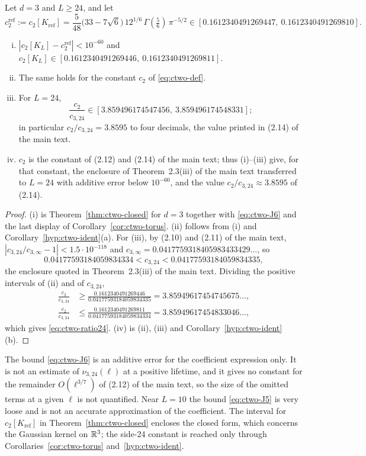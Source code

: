 \begin{corollary}\label{cor:ctwo-side24}
Let $d=3$ and $L\ge24$, and let
\[
c_2^{\mathrm{ref}}:=c_2[K_{\mathrm{ref}}]=\frac5{48}\bigl(33-7\sqrt6\bigr)\,12^{1/6}\,\Gamma(\tfrac56)\,\pi^{-5/2}\in[0.1612340491269447,\ 0.1612340491269810].
\]
\begin{enumerate}[(i),leftmargin=2em]
\item $|c_2[K_L]-c_2^{\mathrm{ref}}|<10^{-60}$ and $c_2[K_L]\in[0.1612340491269446,\ 0.1612340491269811]$.
\item The same holds for the constant $c_2$ of \eqref{eq:ctwo-def}.
\item For $L=24$,
\begin{equation}\label{eq:ctwo-ratio24}
\frac{c_2}{c_{3,24}}\in[3.859496174547456,\ 3.859496174548331];
\end{equation}
in particular $c_2/c_{3,24}=3.8595$ to four decimals, the value printed in (2.14) of the main text.
\item $c_2$ is the constant of (2.12) and (2.14) of the main text; thus (i)--(iii) give, for that constant, the enclosure of Theorem~2.3(iii) of the main text transferred to $L=24$ with additive error below $10^{-60}$, and the value $c_2/c_{3,24}\approx3.8595$ of (2.14).
\end{enumerate}
\end{corollary}

\begin{proof}
(i) is Theorem~\ref{thm:ctwo-closed} for $d=3$ together with \eqref{eq:ctwo-J6} and the last display of Corollary~\ref{cor:ctwo-torus}. (ii) follows from (i) and Corollary~\ref{hyp:ctwo-ident}(a). For (iii), by (2.10) and (2.11) of the main text, $|c_{3,24}/c_{3,\infty}-1|<1.5\cdot10^{-118}$ and $c_{3,\infty}=0.0417759318405983433429\ldots$, so
\[
0.04177593184059834334<c_{3,24}<0.04177593184059834335,
\]
the enclosure quoted in Theorem~2.3(iii) of the main text. Dividing the positive intervals of (ii) and of $c_{3,24}$,
\begin{align*}
\frac{c_2}{c_{3,24}}&\ge\frac{0.1612340491269446}{0.04177593184059834335}=3.85949617454745675\ldots,\\
\frac{c_2}{c_{3,24}}&\le\frac{0.1612340491269811}{0.04177593184059834334}=3.85949617454833046\ldots,
\end{align*}
which gives \eqref{eq:ctwo-ratio24}. (iv) is (ii), (iii) and Corollary~\ref{hyp:ctwo-ident}(b).
\end{proof}

\begin{remark}[scope]\label{rem:ctwo-scope}
The bound \eqref{eq:ctwo-J6} is an additive error for the coefficient expression only. It is not an estimate of $\nu_{3,24}(\ell)$ at a positive lifetime, and it gives no constant for the remainder $O(\ell^{3/7})$ of (2.12) of the main text, so the size of the omitted terms at a given $\ell$ is not quantified. Near $L=10$ the bound \eqref{eq:ctwo-J5} is very loose and is not an accurate approximation of the coefficient. The interval for $c_2[K_{\mathrm{ref}}]$ in Theorem~\ref{thm:ctwo-closed} encloses the closed form, which concerns the Gaussian kernel on $\mathbb R^3$; the side-24 constant is reached only through Corollaries~\ref{cor:ctwo-torus} and~\ref{hyp:ctwo-ident}.
\end{remark}
